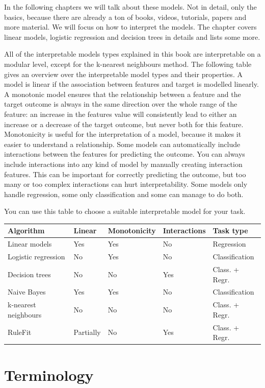 \documentclass[12pt,]{krantz}
\theoremstyle{definition}
\theoremstyle{definition}
\theoremstyle{definition}
\theoremstyle{remark}
\begin{document}
In the following chapters we will talk about these models. Not in
detail, only the basics, because there are already a ton of books,
videos, tutorials, papers and more material. We will focus on how to
interpret the models. The chapter covers linear models, logistic
regression and decision trees in details and lists some more.

All of the interpretable models types explained in this book are
interpretable on a modular level, except for the k-nearest neighbours
method. The following table gives an overview over the interpretable
model types and their properties. A model is linear if the association
between features and target is modelled linearly. A monotonic model
ensures that the relationship between a feature and the target outcome
is always in the same direction over the whole range of the feature: an
increase in the features value will consistently lead to either an
increase or a decrease of the target outcome, but never both for this
feature. Monotonicity is useful for the interpretation of a model,
because it makes it easier to understand a relationship. Some models can
automatically include interactions between the features for predicting
the outcome. You can always include interactions into any kind of model
by manually creating interaction features. This can be important for
correctly predicting the outcome, but too many or too complex
interactions can hurt interpretability. Some models only handle
regression, some only classification and some can manage to do both.

You can use this table to choose a suitable interpretable model for your
task.

\begin{longtable}[]{@{}lllll@{}}
\toprule
Algorithm & Linear & Monotonicity & Interactions & Task
type\tabularnewline
\midrule
\endhead
Linear models & Yes & Yes & No & Regression\tabularnewline
Logistic regression & No & Yes & No & Classification\tabularnewline
Decision trees & No & No & Yes & Class. + Regr.\tabularnewline
Naive Bayes & Yes & Yes & No & Classification\tabularnewline
k-nearest neighbours & No & No & No & Class. + Regr.\tabularnewline
RuleFit & Partially & No & Yes & Class. + Regr.\tabularnewline
\bottomrule
\end{longtable}

\section{Terminology}\label{terminology}
\end{document}
